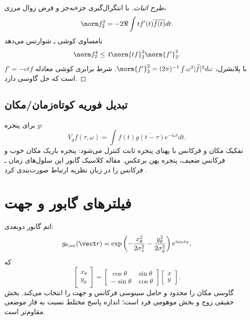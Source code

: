 \begin{proof}[طرح اثبات]
با انتگرال‌گیری جزءبه‌جز و فرض زوال مرزی،
\begin{equation}
\norm f_2^2=-2\Re\int t f'(t)\overline{f(t)}dt.
\end{equation}
نامساوی کوشی ـ شوارتس می‌دهد
\begin{equation}
\norm f_2^4\le4\norm{tf}_2^2\norm{f'}_2^2.
\end{equation}
با پلانشرل، \(\norm{f'}_2^2=(2\pi)^{-1}\int\omega^2|\widehat f|^2d\omega\). شرط برابری کوشی
معادله \(f'=-ctf\) است که حل گاوسی دارد.
\end{proof}

\subsection{تبدیل فوریه کوتاه‌زمان/مکان}
برای پنجره \(g\):
\begin{equation}
V_gf(\tau,\omega)=\int f(t)\overline{g(t-\tau)}e^{-i\omega t}dt.
\end{equation}
تفکیک مکان و فرکانس با پهنای پنجره ثابت کنترل می‌شود: پنجره باریک مکان خوب و فرکانس ضعیف، پنجره پهن
برعکس. مقاله کلاسیک گابور این سلول‌های زمان ـ فرکانس را در زبان نظریه ارتباط صورت‌بندی کرد
\cite{gabor1946communication}.

\section{فیلترهای گابور و جهت}

اتم گابور دوبعدی:
\begin{equation}
g_{\theta,\omega_0}(\vect r)
=\exp\left(-\frac{x_\theta^2}{2\sigma_x^2}-\frac{y_\theta^2}{2\sigma_y^2}\right)
 e^{i\omega_0x_\theta},
\end{equation}
که
\begin{equation}
\begin{bmatrix}x_\theta\\y_\theta\end{bmatrix}
=\begin{bmatrix}\cos\theta&\sin\theta\\-\sin\theta&\cos\theta\end{bmatrix}
\begin{bmatrix}x\\y\end{bmatrix}.
\end{equation}
گاوسی مکان را محدود و حامل سینوسی فرکانس و جهت را انتخاب می‌کند. بخش حقیقی زوج و بخش موهومی فرد است؛
اندازه پاسخ مختلط نسبت به فاز موضعی مقاوم‌تر است.

